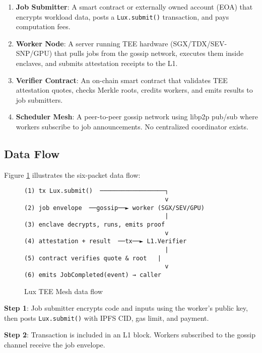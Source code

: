 \documentclass[11pt,letterpaper]{article}
\begin{document}
\begin{enumerate}
  \item \textbf{Job Submitter}: A smart contract or externally owned account (EOA) that encrypts workload data, posts a \texttt{Lux.submit()} transaction, and pays computation fees.

  \item \textbf{Worker Node}: A server running TEE hardware (SGX/TDX/SEV-SNP/GPU) that pulls jobs from the gossip network, executes them inside enclaves, and submits attestation receipts to the L1.

  \item \textbf{Verifier Contract}: An on-chain smart contract that validates TEE attestation quotes, checks Merkle roots, credits workers, and emits results to job submitters.

  \item \textbf{Scheduler Mesh}: A peer-to-peer gossip network using libp2p pub/sub where workers subscribe to job announcements. No centralized coordinator exists.
\end{enumerate}

\subsection{Data Flow}

Figure \ref{fig:dataflow} illustrates the six-packet data flow:

\begin{figure}[h]
\centering
\begin{verbatim}
(1) tx Lux.submit()  ──────────────────┐
                                       v
(2) job envelope  ──gossip──► worker (SGX/SEV/GPU)
                                       |
(3) enclave decrypts, runs, emits proof
                                       v
(4) attestation + result  ──tx──► L1.Verifier
                                       |
(5) contract verifies quote & root   |
                                       v
(6) emits JobCompleted(event) → caller
\end{verbatim}
\caption{Lux TEE Mesh data flow}
\label{fig:dataflow}
\end{figure}

\textbf{Step 1}: Job submitter encrypts code and inputs using the worker's public key, then posts \texttt{Lux.submit()} with IPFS CID, gas limit, and payment.

\textbf{Step 2}: Transaction is included in an L1 block. Workers subscribed to the gossip channel receive the job envelope.
\end{document}
